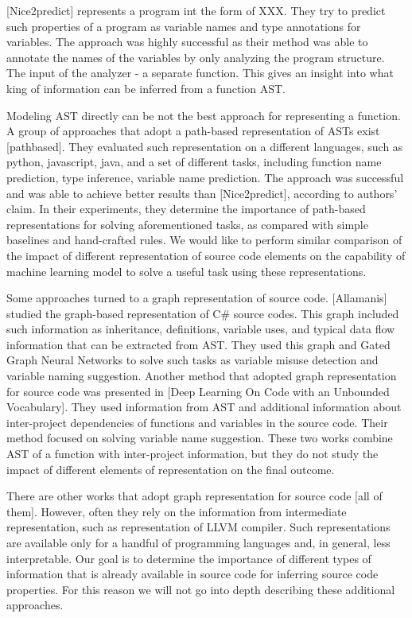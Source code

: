 \documentclass[a4paper,twoside]{article}
\begin{document}
[Nice2predict] represents a program int the form of XXX. They try to predict such properties of a program as variable names and type annotations for variables. The approach was highly successful as their method was able to annotate the names of the variables by only analyzing the program structure. The input of the analyzer - a separate function. This gives an insight into what king of information can be inferred from a function AST.

Modeling AST directly can be not the best approach for representing a function. A group of approaches that adopt a path-based representation of ASTs exist [pathbased]. They evaluated such representation on a different languages, such as python, javascript, java, and a set of different tasks, including function name prediction, type inference, variable name prediction. The approach was successful and was able to achieve better results than [Nice2predict], according to authors' claim. In their experiments, they determine the importance of path-based representations for solving aforementioned tasks, as compared with simple baselines and hand-crafted rules. We would like to perform similar comparison of the impact of different representation of source code elements on the capability of machine learning model to solve a useful task using these representations.

Some approaches turned to a graph representation of source code. [Allamanis] studied the graph-based representation of C\# source codes. This graph included such information as inheritance, definitions, variable uses, and typical data flow information that can be extracted from AST. They used this graph and Gated Graph Neural Networks to solve such tasks as variable misuse detection and variable naming suggestion. Another method that adopted graph representation for source code was presented in [Deep Learning On Code with an Unbounded Vocabulary]. They used information from AST and additional information about inter-project dependencies of functions and variables in the source code. Their method focused on solving variable name suggestion. These two works combine AST of a function with inter-project information, but they do not study the impact of different elements of representation on the final outcome. 

There are other works that adopt graph representation for source code [all of them]. However, often they rely on the information from intermediate representation, such as representation of LLVM compiler. Such representations are available only for a handful of programming languages and, in general, less interpretable. Our goal is to determine the importance of different types of information that is already available in source code for inferring source code properties. For this reason we will not go into depth describing these additional approaches. 
\end{document}
